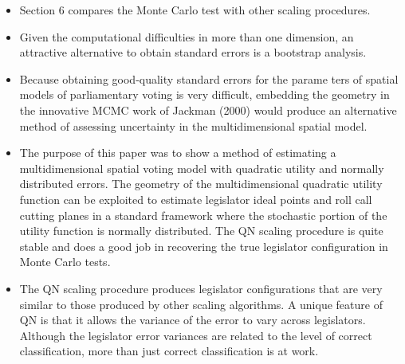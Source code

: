 \documentclass[a4paper,12pt]{article}
\begin{document}
\begin{enumerate}
\begin{itemize}
\item Section 6 compares the Monte Carlo test with other scaling procedures. 
\item Given the computational difficulties in more than one dimension, an attractive alternative to obtain standard errors is a bootstrap analysis. 
\item Because obtaining good-quality standard errors for the parame ters of spatial models of parliamentary voting is very difficult, embedding the geometry in the innovative MCMC work of Jackman (2000) would produce an alternative method of assessing uncertainty in the multidimensional spatial model.
\item The purpose of this paper was to show a method of estimating a multidimensional spatial voting model with quadratic utility and normally distributed errors. The geometry of the multidimensional quadratic utility function can be exploited to estimate legislator ideal points and roll call cutting planes in a standard framework where the stochastic portion of the utility function is normally distributed. The QN scaling procedure is quite stable and does a good job in recovering the true legislator configuration in Monte Carlo tests. 
\item The QN scaling procedure produces legislator configurations that are very similar to those produced by other scaling algorithms. A unique feature of QN is that it allows the variance of the error to vary across legislators. Although the legislator error variances are related to the level of correct classification, more than just correct classification is at work.

\end{itemize}


\end{enumerate}
\end{document}
